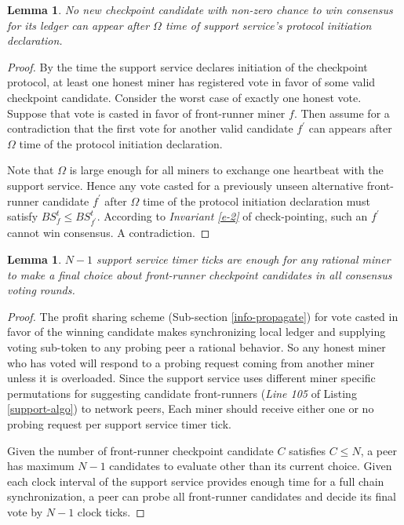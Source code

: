 \documentclass[conference]{IEEEtran}
\newtheorem{lemma}[theorem]{Lemma}
\begin{document}
\begin{lemma}
\label{l-cand-list}
No new checkpoint candidate with non-zero chance to win consensus for its ledger can appear after $\Omega$ time of support service's protocol initiation declaration.     
\end{lemma}
\begin{proof}
By the time the support service declares initiation of the checkpoint protocol, at least one honest miner has registered vote in favor of some valid checkpoint candidate. Consider the worst case of exactly one honest vote. Suppose that vote is casted in favor of front-runner miner $f$. Then assume for a contradiction that the first vote for another valid candidate $f^\prime$ can appears after $\Omega$ time of the protocol initiation declaration. 

Note that $\Omega$ is large enough for all miners to exchange one heartbeat with the support service. Hence any vote casted for a previously unseen alternative front-runner candidate $f^\prime$ after $\Omega$ time of the protocol initiation declaration must satisfy $BS_f^t \leq BS_{f^\prime}^t$. According to \textit{Invariant \ref{e-2}} of check-pointing, such an $f^\prime$ cannot win consensus. A contradiction.  
\end{proof}

\begin{lemma}
\label{l-round-time}
$N - 1$ support service timer ticks are enough for any rational miner to make a final choice about front-runner checkpoint candidates in all consensus voting rounds.   
\end{lemma}
\begin{proof}
The profit sharing scheme (Sub-section \ref{info-propagate}) for vote casted in favor of the winning candidate makes synchronizing local ledger and supplying voting sub-token to any probing peer a rational behavior. So any honest miner who has voted will respond to a probing request coming from another miner unless it is overloaded. Since the support service uses different miner specific permutations for suggesting candidate front-runners (\textit{Line 105} of Listing \ref{support-algo}) to network peers, Each miner should receive either one or no probing request per support service timer tick.

Given the number of front-runner checkpoint candidate $C$ satisfies $C \leq N$, a peer has maximum $N - 1$ candidates to evaluate other than its current choice. Given each clock interval of the support service provides enough time for a full chain synchronization, a peer can probe all front-runner candidates and decide its final vote by $N - 1$ clock ticks.         
\end{proof}
\end{document}
